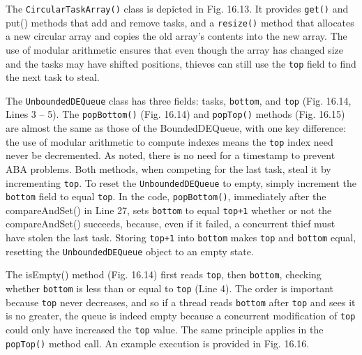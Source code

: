 The \lstinline!CircularTaskArray()! class is depicted in
Fig. 16.13. It provides \lstinline!get()! and put() methods that add
and remove tasks, and a \lstinline!resize()! method that allocates a
new circular array and copies the old array's contents into the new
array. The use of modular arithmetic ensures that even though the
array has changed size and the tasks may have shifted positions,
thieves can still use the \lstinline!top! field to find the next task
to steal.

The \lstinline!UnboundedDEQueue! class has three fields: tasks,
\lstinline!bottom!, and \lstinline!top! (Fig. 16.14, Lines 3 -- 5). The
\lstinline!popBottom()! (Fig. 16.14) and \lstinline!popTop()! methods
(Fig. 16.15) are almost the same as those of the BoundedDEQueue, with
one key difference: the use of modular arithmetic to compute indexes
means the \lstinline!top! index need never be decremented. As noted,
there is no need for a timestamp to prevent ABA problems. Both
methods, when competing for the last task, steal it by incrementing
\lstinline!top!. To reset the \lstinline!UnboundedDEQueue! to empty,
simply increment the \lstinline!bottom! field to equal
\lstinline!top!. In the code, \lstinline!popBottom()!, immediately
after the compareAndSet() in Line 27, sets \lstinline!bottom! to equal
\lstinline!top+1! whether or not the compareAndSet() succeeds,
because, even if it failed, a concurrent thief must have stolen the
last task. Storing \lstinline!top+1! into \lstinline!bottom! makes
\lstinline!top! and \lstinline!bottom! equal, resetting the
\lstinline!UnboundedDEQueue! object to an empty state.

The isEmpty() method (Fig. 16.14) first reads \lstinline!top!, then
\lstinline!bottom!, checking whether \lstinline!bottom! is less than
or equal to \lstinline!top! (Line 4). The order is important because
\lstinline!top! never decreases, and so if a thread reads
\lstinline!bottom! after \lstinline!top! and sees it is no greater,
the queue is indeed empty because a concurrent modification of
\lstinline!top! could only have increased the \lstinline!top!
value. The same principle applies in the \lstinline!popTop()! method
call. An example execution is provided in Fig. 16.16.

